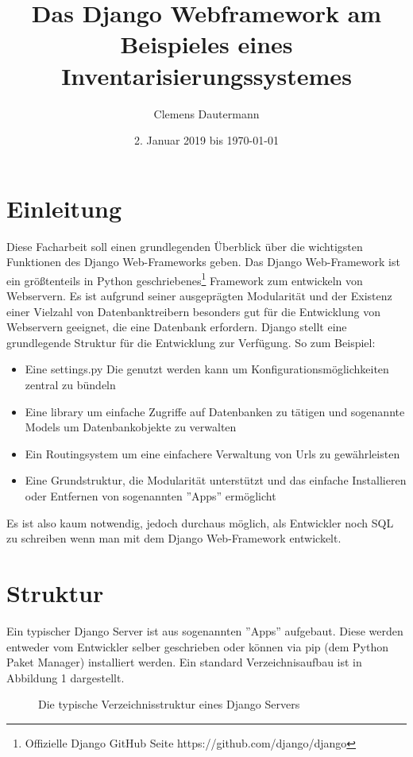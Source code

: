 \documentclass{article}
\title{Das Django Webframework am Beispieles eines Inventarisierungssystemes}
\author{Clemens Dautermann}
\date{2. Januar 2019 bis \today}
\begin{document}
\maketitle
\newpage
\tableofcontents
\newpage


\section{Einleitung}
Diese Facharbeit soll einen grundlegenden Überblick über die wichtigsten Funktionen des Django Web-Frameworks geben.\newline
Das Django Web-Framework ist ein größtenteils in Python geschriebenes\footnote{Offizielle Django GitHub Seite https://github.com/django/django} Framework
zum entwickeln von Webservern. Es ist aufgrund seiner ausgeprägten Modularität und der Existenz einer Vielzahl von Datenbanktreibern besonders gut für
die Entwicklung von Webservern geeignet, die eine Datenbank erfordern.\newline 
Django stellt eine grundlegende Struktur für die Entwicklung zur Verfügung. So zum Beispiel:
\begin{itemize}
	\item Eine settings.py Die genutzt werden kann um Konfigurationsmöglichkeiten zentral zu bündeln
	\item Eine library um einfache Zugriffe auf Datenbanken zu tätigen und sogenannte Models um Datenbankobjekte zu verwalten
	\item Ein Routingsystem um eine einfachere Verwaltung von Urls zu gewährleisten
	\item Eine Grundstruktur, die Modularität unterstützt und das einfache Installieren oder Entfernen von sogenannten ''Apps'' ermöglicht
\end{itemize}
Es ist also kaum notwendig, jedoch durchaus möglich, als Entwickler noch SQL zu schreiben wenn man mit dem Django Web-Framework entwickelt.
\section{Struktur}
Ein typischer Django Server ist aus sogenannten ''Apps'' aufgebaut. Diese werden entweder vom Entwickler selber geschrieben oder können via pip (dem Python Paket Manager) installiert werden. Ein standard Verzeichnisaufbau ist in Abbildung 1 dargestellt.
\begin{figure}[H]
	\caption{Die typische Verzeichnisstruktur eines Django Servers}
\end{figure}
\end{document}
